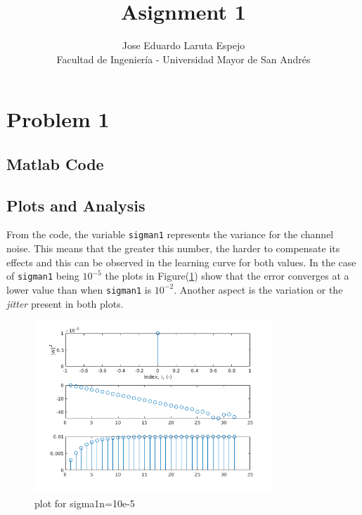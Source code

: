 \documentclass[12pt,letterpaper]{article}
\title{Asignment 1}
\author{Jose Eduardo Laruta Espejo \\ Facultad de Ingeniería - Universidad Mayor de San Andrés}
\begin{document}
\maketitle
\section{Problem 1}
\subsection{Matlab Code}



\subsection{Plots and Analysis}
From the code, the variable \verb|sigman1| represents the variance for the channel noise. This means that the greater 
this number, the harder to compensate its effects and this can be observed in the 
learning curve for both values. In the case of \verb|sigman1| being $10^{-5}$ 
the plots in Figure(\ref{fig:simu5}) show that the error converges at a lower value than when \verb|sigman1|
is $10^{-2}$. Another aspect is the variation or the \textit{jitter} present in both plots.

\begin{figure}[!h] 
\centering
\includegraphics[width=0.8\textwidth]{../matlab/img/e-5.png}
\caption{plot for sigma1n=10e-5}
\label{fig:simu5}
\end{figure}
\end{document}
